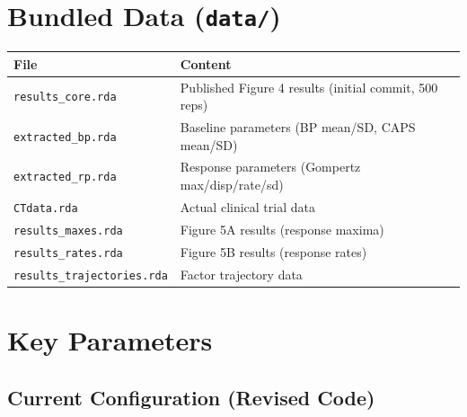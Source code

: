 \documentclass[11pt]{article}
\begin{document}
\section{Bundled Data (\texttt{data/})}

\begin{table}[h]
\centering
\begin{tabular}{ll}
\toprule
File & Content \\
\midrule
\texttt{results\_core.rda} & Published Figure 4 results (initial commit, 500 reps) \\
\texttt{extracted\_bp.rda} & Baseline parameters (BP mean/SD, CAPS mean/SD) \\
\texttt{extracted\_rp.rda} & Response parameters (Gompertz max/disp/rate/sd) \\
\texttt{CTdata.rda} & Actual clinical trial data \\
\texttt{results\_maxes.rda} & Figure 5A results (response maxima) \\
\texttt{results\_rates.rda} & Figure 5B results (response rates) \\
\texttt{results\_trajectories.rda} & Factor trajectory data \\
\bottomrule
\end{tabular}
\end{table}

\section{Key Parameters}

\subsection{Current Configuration (Revised Code)}
\end{document}
